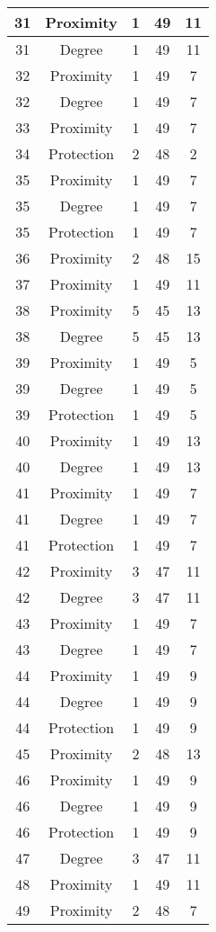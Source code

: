 \documentclass[results.tex]{subfiles}
\begin{document}
\begin{center}
\begin{tabular}{| c || c | c | c | c |}
    \hline
    31 & Proximity & 1 & 49 & 11 \\ 
    \hline
    31 & Degree & 1 & 49 & 11 \\ 
    \hline
    32 & Proximity & 1 & 49 & 7 \\ 
    \hline
    32 & Degree & 1 & 49 & 7 \\ 
    \hline
    33 & Proximity & 1 & 49 & 7 \\ 
    \hline
    34 & Protection & 2 & 48 & 2 \\ 
    \hline
    35 & Proximity & 1 & 49 & 7 \\ 
    \hline
    35 & Degree & 1 & 49 & 7 \\ 
    \hline
    35 & Protection & 1 & 49 & 7 \\ 
    \hline
    36 & Proximity & 2 & 48 & 15 \\ 
    \hline
    37 & Proximity & 1 & 49 & 11 \\ 
    \hline
    38 & Proximity & 5 & 45 & 13 \\ 
    \hline
    38 & Degree & 5 & 45 & 13 \\ 
    \hline
    39 & Proximity & 1 & 49 & 5 \\ 
    \hline
    39 & Degree & 1 & 49 & 5 \\ 
    \hline
    39 & Protection & 1 & 49 & 5 \\ 
    \hline
    40 & Proximity & 1 & 49 & 13 \\ 
    \hline
    40 & Degree & 1 & 49 & 13 \\ 
    \hline
    41 & Proximity & 1 & 49 & 7 \\ 
    \hline
    41 & Degree & 1 & 49 & 7 \\ 
    \hline
    41 & Protection & 1 & 49 & 7 \\ 
    \hline
    42 & Proximity & 3 & 47 & 11 \\ 
    \hline
    42 & Degree & 3 & 47 & 11 \\ 
    \hline
    43 & Proximity & 1 & 49 & 7 \\ 
    \hline
    43 & Degree & 1 & 49 & 7 \\ 
    \hline
    44 & Proximity & 1 & 49 & 9 \\ 
    \hline
    44 & Degree & 1 & 49 & 9 \\ 
    \hline
    44 & Protection & 1 & 49 & 9 \\ 
    \hline
    45 & Proximity & 2 & 48 & 13 \\ 
    \hline
    46 & Proximity & 1 & 49 & 9 \\ 
    \hline
    46 & Degree & 1 & 49 & 9 \\ 
    \hline
    46 & Protection & 1 & 49 & 9 \\ 
    \hline
    47 & Degree & 3 & 47 & 11 \\ 
    \hline
    48 & Proximity & 1 & 49 & 11 \\ 
    \hline
    49 & Proximity & 2 & 48 & 7 \\ 
    \hline   \end{tabular}
\end{center}
\end{document}
